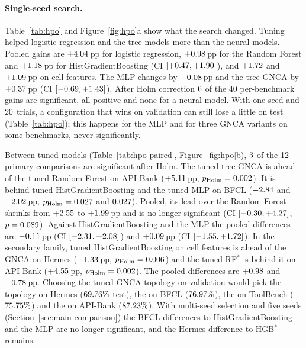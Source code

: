 \documentclass[10pt]{article}
\begin{document}
\paragraph{Single-seed search.} Table~\ref{tab:hpo} and Figure~\ref{fig:hpo}a show what the search changed. Tuning helped logistic regression and the tree models more than the neural models. Pooled gains are $+4.04$\,pp for logistic regression, $+0.98$\,pp for the Random Forest and $+1.18$\,pp for HistGradientBoosting (CI $[+0.47, +1.90]$), and $+1.72$ and $+1.09$\,pp on cell features. The MLP changes by $-0.08$\,pp and the tree GNCA by $+0.37$\,pp (CI $[-0.69, +1.43]$). After Holm correction $6$ of the 40 per-benchmark gains are significant, all positive and none for a neural model. With one seed and $20$ trials, a configuration that wins on validation can still lose a little on test (Table~\ref{tab:hpo}); this happens for the MLP and for three GNCA variants on some benchmarks, never significantly.

Between tuned models (Table~\ref{tab:hpo-paired}, Figure~\ref{fig:hpo}b), $3$ of the 12 primary comparisons are significant after Holm. The tuned tree GNCA is ahead of the tuned Random Forest on API-Bank ($+5.11$\,pp, $p_{\text{Holm}}=0.002$). It is behind tuned HistGradientBoosting and the tuned MLP on BFCL ($-2.84$ and $-2.02$\,pp, $p_{\text{Holm}}=0.027$ and $0.027$). Pooled, its lead over the Random Forest shrinks from $+2.55$ to $+1.99$\,pp and is no longer significant (CI $[-0.30, +4.27]$, $p=0.089$). Against HistGradientBoosting and the MLP the pooled differences are $-0.11$\,pp (CI $[-2.31, +2.08]$) and $+0.09$\,pp (CI $[-1.55, +1.72]$). In the secondary family, tuned HistGradientBoosting on cell features is ahead of the GNCA on Hermes ($-1.33$\,pp, $p_{\text{Holm}}=0.006$) and the tuned RF$^\ast$ is behind it on API-Bank ($+4.55$\,pp, $p_{\text{Holm}}=0.002$). The pooled differences are $+0.98$ and $-0.78$\,pp. Choosing the tuned GNCA topology on validation would pick the \numTVsHerModel{} topology on Hermes ($69.76\%$ test), the \numTVsBfclModel{} on BFCL ($76.97\%$), the \numTVsTbModel{} on ToolBench ($75.75\%$) and the \numTVsAbModel{} on API-Bank ($87.23\%$). With multi-seed selection and five seeds (Section~\ref{sec:main-comparison}) the BFCL differences to HistGradientBoosting and the MLP are no longer significant, and the Hermes difference to HGB$^\ast$ remains.
\end{document}
